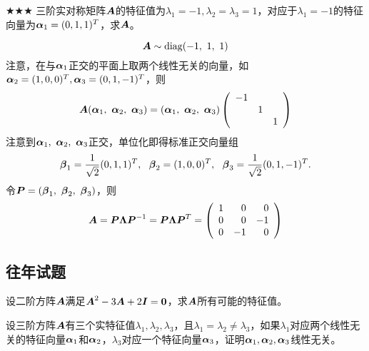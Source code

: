        \begin{frame}
            \begin{li}{$\bigstar\bigstar\bigstar$}
              三阶实对称矩阵$\boldsymbol{A}$的特征值为$\lambda_1=-1,\lambda_2=\lambda_3=1$，对应于$\lambda_1=-1$的特征向量为$\boldsymbol{\alpha}_1=(0,1,1)^T$，求$\boldsymbol{A}$。
            \end{li}\pause\proofname
            $$
            \boldsymbol{A} \sim \mathrm{diag}(-1,~1,~1)
            $$ 
            注意，在与$\boldsymbol{\alpha}_1$正交的平面上取两个线性无关的向量，如$\boldsymbol{\alpha}_2=(1,0,0)^T,\boldsymbol{\alpha}_3=(0,1,-1)^T$，则
            $$
            \boldsymbol{A}(\boldsymbol{\alpha}_1,~\boldsymbol{\alpha}_2,~\boldsymbol{\alpha}_3)=(\boldsymbol{\alpha}_1,~\boldsymbol{\alpha}_2,~\boldsymbol{\alpha}_3)\left(
              \begin{array}{ccc}
                -1&&\\
                  &1&\\
                  &&1
              \end{array}
            \right)
            $$ 
            注意到$\boldsymbol{\alpha}_1,~\boldsymbol{\alpha}_2,~\boldsymbol{\alpha}_3$正交，单位化即得标准正交向量组
            $$
            \boldsymbol{\beta}_1=\frac1{\sqrt{2}}(0,1,1)^T,~~
            \boldsymbol{\beta}_2=(1,0,0)^T,~~
            \boldsymbol{\beta}_3=\frac1{\sqrt{2}}(0,1,-1)^T.
            $$ 
            令$\boldsymbol{P}=(\boldsymbol{\beta}_1,~\boldsymbol{\beta}_2,~\boldsymbol{\beta}_3)$，则
            $$
            \boldsymbol{A}=\boldsymbol{P}\mathbf{\Lambda}\boldsymbol{P}^{-1}=\boldsymbol{P}\mathbf{\Lambda}\boldsymbol{P}^{T}
            = \left(
              \begin{array}{rrr}
                1&0&0\\
                0&0&-1\\
                0&-1&0
              \end{array}
            \right)
            $$
        \end{frame}


        \subsection{往年试题}

        \begin{frame} 
          
          \begin{li}[05-06上]
            设二阶方阵$\boldsymbol{A}$满足$\MA^2-3\MA+2\MI=\M0$，求$\boldsymbol{A}$所有可能的特征值。
          \end{li}
        \end{frame}

        \begin{frame}
          \begin{li}[05-06下]
            设三阶方阵$\boldsymbol{A}$有三个实特征值$\lambda_1,\lambda_2,\lambda_3$，且$\lambda_1=\lambda_2\ne\lambda_3$，如果$\lambda_1$对应两个线性无关的特征向量$\boldsymbol{\alpha}_1$和$\boldsymbol{\alpha}_2$，$\lambda_3$对应一个特征向量$\boldsymbol{\alpha}_3$，证明$\boldsymbol{\alpha}_1,\boldsymbol{\alpha}_2,\boldsymbol{\alpha}_3$线性无关。
          \end{li}
        \end{frame}

